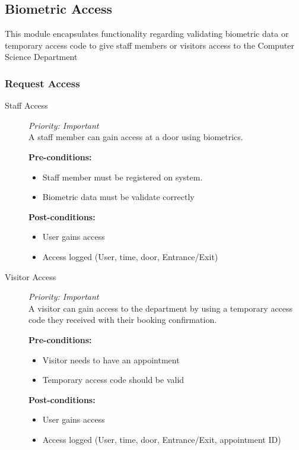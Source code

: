 \subsection{Biometric Access}

This module encapsulates functionality regarding validating biometric data or temporary access code to give staff members or visitors access to the Computer Science Department


\subsubsection{Request Access}

\begin{description}
\item[Staff Access]\hfill \textit{Priority: Important} \\
A staff member can gain access at a door using biometrics.

\textbf{Pre-conditions:} 
	\begin{itemize}
		\item Staff member must be registered on system.
		\item Biometric data must be validate correctly
	\end{itemize}
\textbf{Post-conditions:} 
	\begin{itemize}
		\item User gains access
		\item Access logged (User, time, door, Entrance/Exit)
	\end{itemize}
\end{description}

\begin{description}
\item[Visitor Access]\hfill \textit{Priority: Important} \\
A visitor can gain access to the department by using a temporary access code they received with  their booking confirmation.

\textbf{Pre-conditions:} 
	\begin{itemize}
		\item Visitor needs to have an appointment
		\item Temporary access code should be valid
	\end{itemize}
\textbf{Post-conditions:} 
	\begin{itemize}
		\item User gains access
		\item Access logged (User, time, door, Entrance/Exit, appointment ID) 
	\end{itemize}
\end{description}